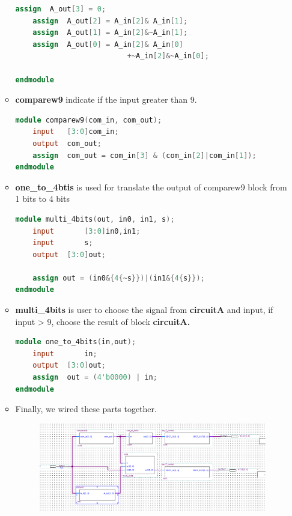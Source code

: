 \begin{itemize}
\begin{itemize}
\begin{lstlisting}[language=verilog]
	assign	A_out[3] = 0;
	assign 	A_out[2] = A_in[2]& A_in[1];
	assign	A_out[1] = A_in[2]&~A_in[1];
	assign 	A_out[0] = A_in[2]& A_in[0]  
					      +~A_in[2]&~A_in[0];
			
endmodule
                \end{lstlisting}
            \item [] \textbf{comparew9} indicate if the input greater than 9.
                \begin{lstlisting}[language=verilog]
module comparew9(com_in, com_out);
	input 	[3:0]com_in;
	output	com_out;
	assign 	com_out = com_in[3] & (com_in[2]|com_in[1]);
endmodule
                \end{lstlisting}
            \item [] \textbf{one\_to\_4btis} is used for translate the output of comparew9 block from 1 bits to 4 bits
                \begin{lstlisting}[language=verilog]
module multi_4bits(out, in0, in1, s);
	input		[3:0]in0,in1;
	input		s;
	output	[3:0]out;
	
	assign out = (in0&{4{~s}})|(in1&{4{s}}); 
endmodule
                \end{lstlisting}            
            \item [] \textbf{multi\_4bits} is user to choose the signal from \textbf{circuitA} and input, if input > 9, choose the result of block \textbf{circuitA.}
                \begin{lstlisting}[language=verilog]
module one_to_4bits(in,out);
	input		in;
	output	[3:0]out;
	assign 	out = (4'b0000) | in;
endmodule
                \end{lstlisting}               
            \item [] Finally, we wired these parts together. 
            \begin{figure}[h]
                \centering
                \includegraphics[width=\textwidth]{source/picture/Lab2/Lab2_2.png}
            \end{figure}
        \end{itemize}
\end{itemize}
\clearpage
